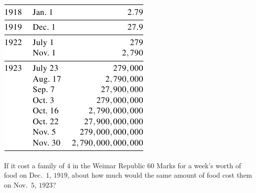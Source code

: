 \documentclass{ximera}
\begin{document}
\begin{image}
\includegraphics{InflationTable1.png}
\end{image}

\begin{question}
If it cost a family of $4$ in the Weimar Republic $60$ Marks for a week's worth of food on Dec.\ $1$, $1919$, about how much would the same amount of food cost them on Nov.\ $5$, $1923$?

\begin{multipleChoice}
\end{multipleChoice}
	
\end{question}
\end{document}
